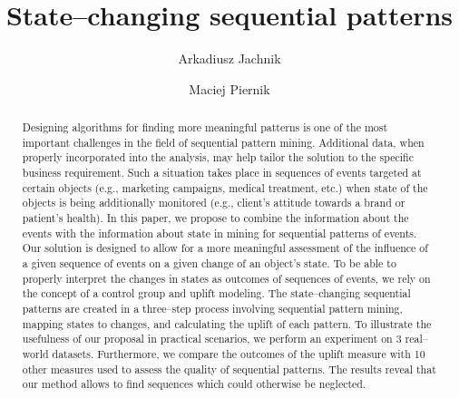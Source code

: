 \documentclass[runningheads,a4paper]{llncs}
\begin{document}
\mainmatter

\title{State--changing sequential patterns}


\author{Arkadiusz Jachnik \and Maciej Piernik}



\maketitle

\begin{abstract}
Designing algorithms for finding more meaningful patterns is one of the most important challenges in the field of sequential pattern mining.
Additional data, when properly incorporated into the analysis, may help tailor the solution to the specific business requirement.
Such a situation takes place in sequences of events targeted at certain objects (e.g., marketing campaigns, medical treatment, etc.) when state of the objects is being additionally monitored (e.g., client's attitude towards a brand or patient's health).
In this paper, we propose to combine the information about the events with the information about state in mining for sequential patterns of events.
Our solution is designed to allow for a more meaningful assessment of the influence of a given sequence of events on a given change of an object's state.
To be able to properly interpret the changes in states as outcomes of sequences of events, we rely on the concept of a control group and uplift modeling.
The state--changing sequential patterns are created in a three--step process involving sequential pattern mining, mapping states to changes, and calculating the uplift of each pattern.
To illustrate the usefulness of our proposal in practical scenarios, we perform an experiment on 3 real--world datasets.
Furthermore, we compare the outcomes of the uplift measure with 10 other measures used to assess the quality of sequential patterns.
The results reveal that our method allows to find sequences which could otherwise be neglected.
\end{abstract}
\end{document}
